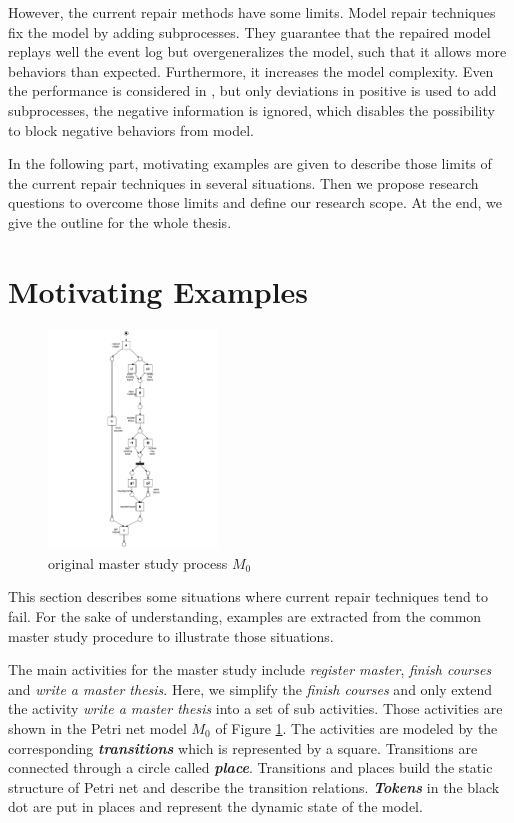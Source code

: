 However, the current repair methods have some limits. Model repair techniques fix the model by adding subprocesses. They guarantee that the repaired model replays well the event log but overgeneralizes the model, such that it allows more behaviors than expected. Furthermore, it increases the model complexity.  Even the performance is considered in \cite{dees2017enhancing}, but only deviations in positive is used to add subprocesses, the negative information is ignored, which disables the possibility to block negative behaviors from model. 

In the following part, motivating examples are given to describe those limits of the current repair techniques in several situations. Then we propose research questions to overcome those limits and define our research scope. At the end, we give the outline for the whole thesis.
\section{Motivating Examples}
\begin{figure}
	\centering
	\includegraphics[clip, trim=7cm 0cm 7cm 0cm, width=0.4\textwidth, height=0.7\textheight]{figures/introduction/Master-original-model.pdf}
	\caption{original master study process $M_0$}
	\label{fig:model_M0}
\end{figure}
This section describes some situations where current repair techniques tend to fail. For the sake of understanding, examples are extracted from the common master study procedure to illustrate those situations.

The main activities for the master study include \emph{register master}, \emph{finish courses} and \emph{write a master thesis}. Here, we simplify the \emph{finish courses} and only extend the activity \emph{write a master thesis} into a set of sub activities. Those activities are shown in the Petri net model $M_0$ of Figure \ref{fig:model_M0}. The activities are modeled by the corresponding \textbf{\emph{transitions}} which is represented by a square. Transitions are connected through a circle called \textbf{\emph{place}}. Transitions and places build the static structure of Petri net and describe the transition relations. \textbf{\emph{Tokens}} in the black dot are put in places and represent the dynamic state of the model. 


